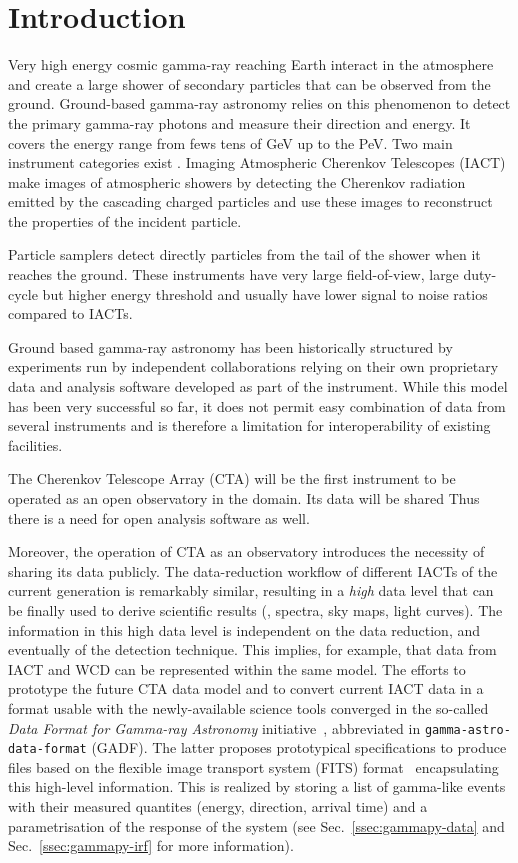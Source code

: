 \section{Introduction}
\label{sec:introduction}



Very high energy cosmic gamma-ray reaching Earth interact in the atmosphere and
create a large shower of secondary particles that can be observed from the ground.
Ground-based gamma-ray astronomy relies on this phenomenon to detect the
primary gamma-ray photons and measure their direction and energy.
It covers the energy range from fews tens of GeV up to the PeV.
Two main instrument categories exist \citep{2015CRPhy..16..610D}.
Imaging Atmospheric Cherenkov Telescopes (IACT) make images of atmospheric showers
by detecting the Cherenkov radiation emitted by the cascading charged particles and
use these images to reconstruct the properties of the incident particle.

Particle samplers detect directly particles from the tail of the shower when it reaches
the ground. These instruments have very large field-of-view, large duty-cycle but higher
energy threshold and usually have lower signal to noise ratios compared to IACTs.

Ground based gamma-ray astronomy has been historically structured
by experiments run by independent collaborations relying
on their own proprietary data and analysis software developed as part of the
instrument. While this model has been very successful so far, it does not
permit easy combination of data from several instruments and is therefore
a limitation for interoperability of existing facilities.

The Cherenkov Telescope Array (CTA) will be the first instrument to be operated
as an open observatory in the domain. Its data will be shared Thus there is a need for open analysis software as well.

Moreover, the operation of CTA as an observatory introduces the necessity of
sharing its data publicly. The data-reduction workflow of different IACTs of
the current generation is remarkably similar, resulting in a \textit{high} data
level that can be finally used to derive scientific results (, spectra, sky
maps, light curves). The information in this high data level is independent on
the data reduction, and eventually of the detection technique. This implies,
for example, that data from IACT and WCD can be represented within the same
model. The efforts to prototype the future CTA data model and to convert
current IACT data in a format usable with the newly-available science tools
converged in the so-called \textit{Data Format for Gamma-ray Astronomy}
initiative~\citep{gadf_proc, gadf_universe}, abbreviated in
\texttt{gamma-astro-data-format} (GADF). The latter proposes prototypical
specifications to produce files based on the flexible image transport system
(FITS) format~\citep{fits} encapsulating this high-level information. This is
realized by storing a list of gamma-like events with their measured quantites
(energy, direction, arrival time) and a parametrisation of the response of the
system (see Sec.~\ref{ssec:gammapy-data} and Sec.~\ref{ssec:gammapy-irf} for
more information).

